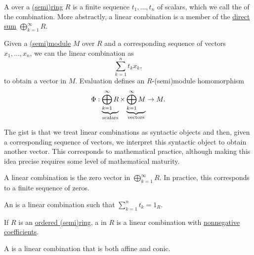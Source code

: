 \begin{definition}\label{def:linear_combination}\mimprovised
  A  over a \hyperref[def:semiring]{(semi)ring} \( R \) is a finite sequence \( t_1, \ldots, t_n \) of scalars, which we call the  of the combination. More abstractly, a linear combination is a member of the \hyperref[def:semimodule_direct_product]{direct sum} \( \bigoplus_{k=1}^\infty R \).

  Given a \hyperref[def:semimodule]{(semi)module} \( M \) over \( R \) and a corresponding sequence of vectors \( x_1, \ldots, x_n \), we can  the linear combination as
  \begin{equation}
    \sum_{k=1}^n t_k x_k,
  \end{equation}
  to obtain a vector in \( M \). Evaluation defines an \( R \)-(semi)module homomorphism
  \begin{equation*}
    \Phi: \underbrace{\bigoplus_{k=1}^\infty R}_{\T{scalars}} \times \underbrace{\bigoplus_{k=1}^\infty M}_{\T{vectors}} \to M.
  \end{equation*}

  The gist is that we treat linear combinations as syntactic objects and then, given a corresponding sequence of vectors, we interpret this syntactic object to obtain another vector. This corresponds to mathematical practice, although making this idea precise requires some level of mathematical maturity.

  \begin{thmenum}
     A  linear combination is the zero vector in \( \bigoplus_{k=1}^\infty R \). In practice, this corresponds to a finite sequence of zeros.

     An  is a linear combination such that \( \sum_{k=1}^n t_k = 1_R \).

     If \( R \) is an \hyperref[def:ordered_semiring]{ordered (semi)ring}, a  in \( R \) is a linear combination with \hyperref[def:ordered_semiring]{nonnegative coefficients}.

     A  is a linear combination that is both affine and conic.
  \end{thmenum}
\end{definition}

